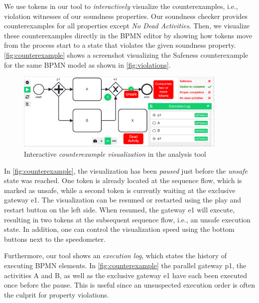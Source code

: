 \documentclass[runningheads]{llncs}
\begin{document}
We use tokens in our tool to \textit{interactively} visualize the counterexamples, i.e., violation witnesses of our soundness properties.
Our soundness checker provides counterexamples for all properties except \textit{No Dead Activities}.
Then, we visualize these counterexamples directly in the BPMN editor by showing how tokens move from the process start to a state that violates the given soundness property.
\autoref{fig:counterexample} shows a screenshot visualizing the Safeness counterexample for the same BPMN model as shown in \autoref{fig:violations}.

\begin{figure}[ht]
	\centering
	\includegraphics[width=0.9\textwidth]{images/counter-example}
	\caption{Interactive \textit{counterexample visualization} in the analysis tool}
	\label{fig:counterexample}
\end{figure}

In \autoref{fig:counterexample}, the visualization has been \textit{paused} just before the \textit{unsafe} state was reached.
One token is already located at the sequence flow, which is marked as unsafe, while a second token is currently waiting at the exclusive gateway \textsf{e1}.
The visualization can be resumed or restarted using the play and restart button on the left side.
When resumed, the gateway \textsf{e1} will execute, resulting in two tokens at the subsequent sequence flow, i.e., an unsafe execution state.
In addition, one can control the visualization speed using the bottom buttons next to the speedometer.

Furthermore, our tool shows an \textit{execution log}, which states the history of executing BPMN elements.
In \autoref{fig:counterexample} the parallel gateway \textsf{p1}, the activities \textsf{A} and \textsf{B}, as well as the exclusive gateway \textsf{e1} have each been executed once before the pause.
This is useful since an unsuspected execution order is often the culprit for property violations.
\end{document}
